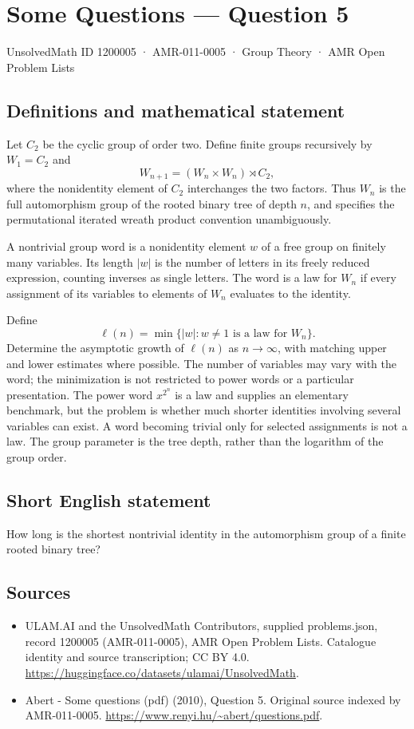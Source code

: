 \documentclass[11pt,a4paper]{article}
\begin{document}
\section*{Some Questions — Question 5}\label{1200005}
{\small UnsolvedMath ID 1200005 · AMR-011-0005 · Group Theory · AMR Open Problem Lists}
\subsection{Definitions and mathematical statement}
Let $C_2$ be the cyclic group of order two. Define finite groups recursively by $W_1=C_2$ and
\[
 W_{n+1}=(W_n\times W_n)\rtimes C_2,
\]
where the nonidentity element of $C_2$ interchanges the two factors. Thus $W_n$ is the full automorphism group of the rooted binary tree of depth $n$, and specifies the permutational iterated wreath product convention unambiguously.

A nontrivial group word is a nonidentity element $w$ of a free group on finitely many variables. Its length $|w|$ is the number of letters in its freely reduced expression, counting inverses as single letters. The word is a law for $W_n$ if every assignment of its variables to elements of $W_n$ evaluates to the identity.

Define
\[
 \ell(n)=\min\{|w|:w\ne1\text{ is a law for }W_n\}.
\]
Determine the asymptotic growth of $\ell(n)$ as $n\to\infty$, with matching upper and lower estimates where possible. The number of variables may vary with the word; the minimization is not restricted to power words or a particular presentation. The power word $x^{2^n}$ is a law and supplies an elementary benchmark, but the problem is whether much shorter identities involving several variables can exist. A word becoming trivial only for selected assignments is not a law. The group parameter is the tree depth, rather than the logarithm of the group order.
\subsection{Short English statement}
How long is the shortest nontrivial identity in the automorphism group of a finite rooted binary tree?
\subsection{Sources}
\begin{itemize}
\item[S1] ULAM.AI and the UnsolvedMath Contributors, supplied problems.json, record 1200005 (AMR-011-0005), AMR Open Problem Lists. Catalogue identity and source transcription; CC BY 4.0.
\url{https://huggingface.co/datasets/ulamai/UnsolvedMath}.
\item[S2] Abert - Some questions (pdf) (2010), Question 5. Original source indexed by AMR-011-0005.
\url{https://www.renyi.hu/~abert/questions.pdf}.
\end{itemize}
\end{document}
